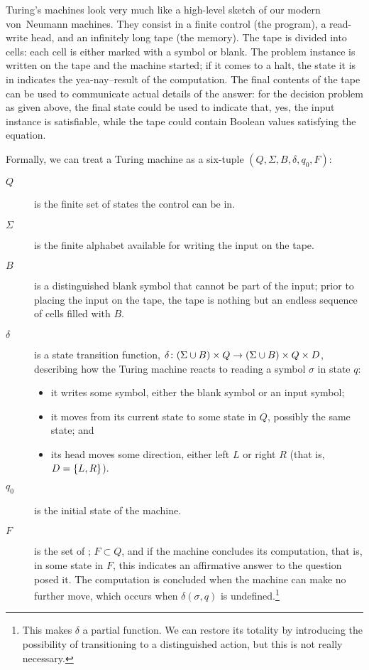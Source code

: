 Turing's machines look very much like a high-level sketch of our modern von~Neumann machines. They consist in a finite control (the program), a read-write head, and an infinitely long tape (the memory). The tape is divided into cells: each cell is either marked with a symbol or blank. The problem instance is written on the tape and the machine started; if it comes to a halt, the state it is in indicates the yea-nay--result of the computation. The final contents of the tape can be used to communicate actual details of the answer: for the decision problem as given above, the final state could be used to indicate that, yes, the input instance is satisfiable, while the tape could contain Boolean values satisfying the equation.

Formally, we can treat a Turing machine as a six-tuple $(Q, \Sigma, B, \delta, q_{0}, F)$:
\begin{description} %
\item[\MakeUppercase{$Q$}] is the finite set of states the control can be in.
\item[$\Sigma$] is the finite alphabet available for writing the input on the tape.
\item[\MakeUppercase{$B$}] is a distinguished blank symbol that cannot be part of the input; prior to placing the input on the tape, the tape is nothing but an endless sequence of cells filled with $B$.
\item[$\delta$] is a state transition function, $\delta\colon (\Sigma \cup B) \times Q \to (\Sigma \cup B) \times Q \times D$, describing how the Turing machine reacts to reading a symbol $\sigma$ in state $q$:
\begin{itemize}
\item it writes some symbol, either the blank symbol or an input symbol; 
\item it moves from its current state to some state in $Q$, possibly the same state; and
\item its head moves some direction, either left $L$ or right $R$ (that is, $D = \left\{ L, R \right\}$).
\end{itemize}
\item[$q_{0}$] is the initial state of the machine.
\item[\MakeUppercase{$F$}] is the set of ; $F \subset Q$, and if the machine concludes its computation, that is,  in some state in $F$, this indicates an affirmative answer to the question posed it. The computation is concluded when the machine can make no further move, which occurs when $\delta(\sigma, q)$ is undefined.\footnote{This makes $\delta$ a partial function. We can restore its totality by introducing the possibility of transitioning to a distinguished  action, but this is not really necessary.}
\end{description}

